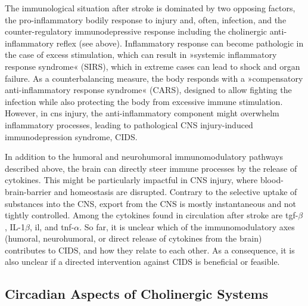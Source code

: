 The immunological situation after stroke is dominated by two opposing factors, the pro-inflammatory bodily response to injury and, often, infection, and the counter-regulatory immunodepressive response including the cholinergic anti-inflammatory reflex (see above). Inflammatory response can become pathologic in the case of excess stimulation, which can result in »systemic inflammatory response syndrome« (SIRS), which in extreme cases can lead to shock and organ failure. As a counterbalancing measure, the body responds with a »compensatory anti-inflammatory response syndrome« (CARS), designed to allow fighting the infection while also protecting the body from excessive immune stimulation. However, in \ac{cns} injury, the anti-inflammatory component might overwhelm inflammatory processes, leading to pathological CNS injury-induced immunodepression syndrome, CIDS.

In addition to the humoral and neurohumoral immunomodulatory pathways described above, the brain can directly steer immune processes by the release of cytokines. This might be particularly impactful in CNS injury, where blood-brain-barrier and homeostasis are disrupted. Contrary to the selective uptake of substances into the CNS, export from the CNS is mostly instantaneous and not tightly controlled. Among the cytokines found in circulation after stroke are \ac{tgf}-$\beta$, IL-1$\beta$, \ac{il}, and \ac{tnf}-$\alpha$. So far, it is unclear which of the immunomodulatory axes (humoral, neurohumoral, or direct release of cytokines from the brain) contributes to CIDS, and how they relate to each other. As a consequence, it is also unclear if a directed intervention against CIDS is beneficial or feasible.

\subsection{Circadian Aspects of Cholinergic Systems}
\todo{}

